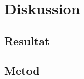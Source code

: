 \section{Diskussion}
\label{sec:bjorn-discussion}



\subsection{Resultat}
\label{subsec:bjorn-discussion-results}



\subsection{Metod}
\label{subsec:bjorn-discussion-method}


